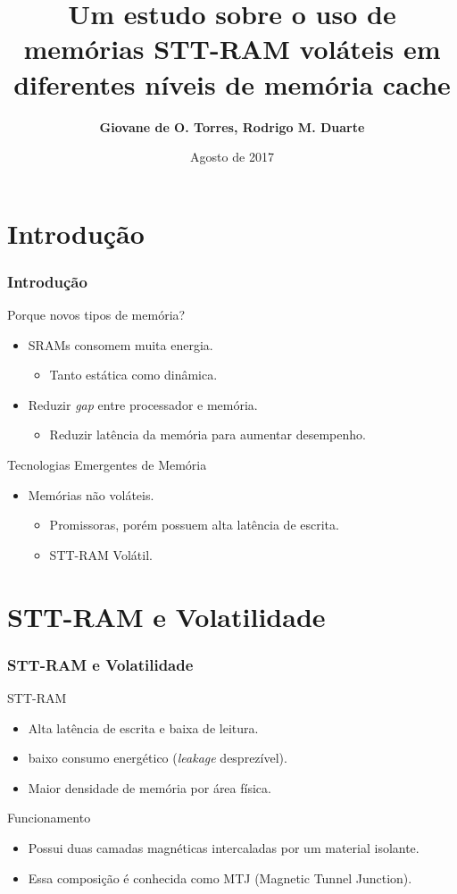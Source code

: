 \documentclass[10pt, pdf,xcolor=pdftex,dvipsnames,table]{beamer}
\title{Um estudo sobre o uso de memórias STT-RAM voláteis em diferentes níveis de memória cache}
\author[]{\textbf{Giovane de O. Torres\inst{1}, Rodrigo M. Duarte\inst{1}}\\
}
\institute{Pós-Graduação em Computação \\ Universidade Federal de Pelotas \\
\url{} 
}
\date{Agosto de 2017}
\begin{document}
\frame{\titlepage}
\frame{\tableofcontents}


\section{Introdução}

\frame
{
\frametitle{Introdução}
		\begin{block}{Porque novos tipos de memória?}
			\begin{itemize}
				\item SRAMs consomem muita energia.
				\begin{itemize}
					\item Tanto estática como dinâmica.
				\end{itemize}
				\item Reduzir \textit{gap} entre processador e memória.
				\begin{itemize}
					\item Reduzir latência da memória para aumentar desempenho.
				\end{itemize}
			\end{itemize}	 
		\end{block}
		\begin{block}{Tecnologias Emergentes de Memória}
			\begin{itemize}
				\item Memórias não voláteis.
				\begin{itemize}
					\item Promissoras, porém possuem alta latência de escrita.
					\item STT-RAM Volátil.
				\end{itemize}
			\end{itemize}	 
		\end{block}
}

\section{STT-RAM e Volatilidade}

\frame
{
\frametitle{STT-RAM e Volatilidade}
		\begin{block}{STT-RAM}
			\begin{itemize}
				\item Alta latência de escrita e baixa de leitura.
				\item baixo consumo energético (\textit{leakage} desprezível).
				\item Maior densidade de memória por área física.
			\end{itemize}	 
		\end{block}
		\begin{block}{Funcionamento}
			\begin{itemize}
				\item Possui duas camadas magnéticas intercaladas por um material isolante.
				\item Essa composição é conhecida como MTJ (Magnetic Tunnel Junction).
			\end{itemize}	 
		\end{block}
}
\end{document}
